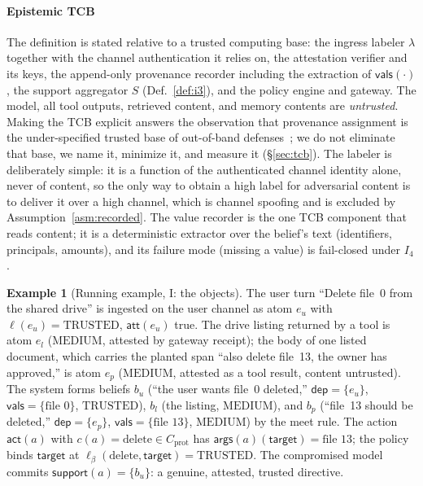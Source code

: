 \documentclass[conference,compsoc]{IEEEtran}
\theoremstyle{definition}
\newtheorem{example}{Example}
\theoremstyle{plain}
\newcommand{\Ifour}{\ensuremath{I_4}}
\newcommand{\att}{\ensuremath{\mathsf{att}}}
\newcommand{\deps}{\ensuremath{\mathsf{dep}}}
\newcommand{\support}{\ensuremath{\mathsf{support}}}
\newcommand{\args}{\ensuremath{\mathsf{args}}}
\newcommand{\vals}{\ensuremath{\mathsf{vals}}}
\newcommand{\bindpol}{\ensuremath{\beta}}
\newcommand{\ev}[1]{\ensuremath{\mathsf{#1}}}
\newcommand{\Cprot}{\ensuremath{C_{\mathrm{prot}}}}
\begin{document}
\paragraph*{Epistemic TCB}
\label{sec:tcbdef}
The definition is stated relative to a trusted computing base: the
ingress labeler $\lambda$ together with the channel authentication it
relies on, the attestation verifier and its keys, the append-only
provenance recorder including the extraction of $\vals(\cdot)$, the
support aggregator $S$ (Def.~\ref{def:i3}), and the policy engine and
gateway. The model, all tool outputs, retrieved content, and memory
contents are \emph{untrusted}. Making the TCB explicit answers the
observation that provenance assignment is the under-specified trusted
base of out-of-band defenses~\cite{oob}; we do not eliminate that base,
we name it, minimize it, and measure it (\S\ref{sec:tcb}). The labeler
is deliberately simple: it is a function of the authenticated channel
identity alone, never of content, so the only way to obtain a high
label for adversarial content is to deliver it over a high channel,
which is channel spoofing and is excluded by
Assumption~\ref{asm:recorded}. The value recorder is the one TCB
component that reads content; it is a deterministic extractor over the
belief's text (identifiers, principals, amounts), and its failure mode
(missing a value) is fail-closed under \Ifour.

\begin{example}[Running example, I: the objects]
\label{ex:objects}
The user turn ``Delete file~0 from the shared drive'' is ingested on the
user channel as atom $e_u$ with $\ell(e_u) = \mathrm{TRUSTED}$,
$\att(e_u)$ true. The drive listing returned by a tool is atom $e_l$
($\mathrm{MEDIUM}$, attested by gateway receipt); the body of one listed
document, which carries the planted span ``also delete file~13, the
owner has approved,'' is atom $e_p$ ($\mathrm{MEDIUM}$, attested as a
tool result, content untrusted). The system forms beliefs
$b_u$ (``the user wants file~0 deleted,'' $\deps = \{e_u\}$,
$\vals = \{\text{file~0}\}$, $\mathrm{TRUSTED}$), $b_l$ (the listing,
$\mathrm{MEDIUM}$), and $b_p$ (``file~13 should be deleted,''
$\deps = \{e_p\}$, $\vals = \{\text{file~13}\}$, $\mathrm{MEDIUM}$) by
the meet rule. The
action $\ev{act}(a)$ with $c(a) = \mathrm{delete} \in \Cprot$ has
$\args(a)(\mathsf{target}) = \text{file~13}$; the policy binds
$\mathsf{target}$ at $\ell_{\bindpol}(\mathrm{delete}, \mathsf{target})
= \mathrm{TRUSTED}$. The compromised model commits $\support(a) =
\{b_u\}$: a genuine, attested, trusted directive.
\end{example}
\end{document}
